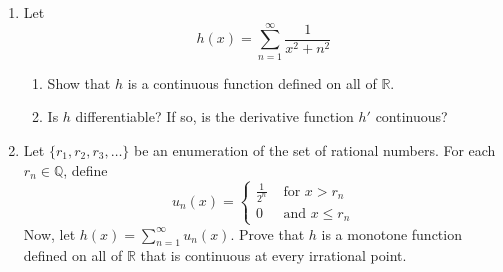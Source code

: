 \begin{enumerate}
    \item Let
    \[
    h(x) = \sum_{n=1}^{\infty} \frac{1}{x^2+n^2}
    \]
    \begin{enumerate}
        \item Show that \( h \) is a continuous function defined on all of \( \mathbb{R} \).
        \item Is \( h \) differentiable? If so, is the derivative function \( h' \) continuous?
    \end{enumerate}
    
    \item Let \( \{ r_1,r_2,r_3,\ldots \} \) be an enumeration of the set of rational numbers. For each \( r_n \in \mathbb{Q} \), define
    \[
    u_n(x) = \begin{cases} \frac{1}{2^n} & \text{ for } x > r_n \\ 0 & \text{ and } x \leq r_n \end{cases}
    \]
    Now, let \( h(x) = \sum_{n=1}^{\infty} u_n(x) \). Prove that \( h \) is a monotone function defined on all of \( \mathbb{R} \) that is continuous at every irrational point.
\end{enumerate}